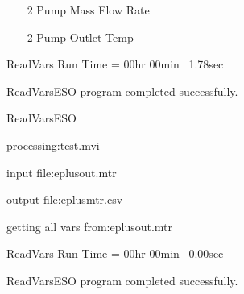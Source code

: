 ~~~~ 2 Pump Mass Flow Rate

~~~~ 2 Pump Outlet Temp

~ReadVars Run Time = 00hr 00min~ 1.78sec

~ReadVarsESO program completed successfully.

~ReadVarsESO

~processing:test.mvi

~input file:eplusout.mtr

~output file:eplusmtr.csv

~getting all vars from:eplusout.mtr

~ReadVars Run Time = 00hr 00min~ 0.00sec

~ReadVarsESO program completed successfully.
